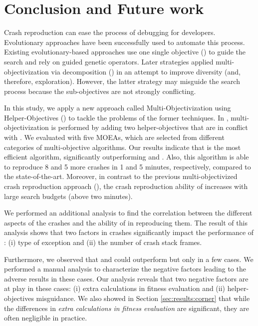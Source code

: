 
\section{Conclusion and Future work} 

Crash reproduction can ease the process of debugging for developers. Evolutionary approaches have been successfully used to automate this process.
Existing evolutionary-based approaches use one single objective (\ie \CrashFunction) to guide the search and rely on guided genetic operators. 
Later strategies applied multi-objectivization via decomposition (\decomposition) in an attempt to improve diversity (and, therefore, exploration). However, the latter strategy may misguide the search process because the sub-objectives are not strongly conflicting.

In this study, we apply a new approach called Multi-Objectivizati\-on using Helper-Objectives (\moho) to tackle the problems of the former techniques. In \moho, multi-objectivization is performed by adding two helper-objectives that are in conflict with \CrashFunction. We evaluated \moho with five MOEAs, which are selected from different categories of multi-objective algorithms. Our results indicate that \moho is the most efficient algorithm, significantly outperforming \SGGA and \decomposition. Also, this algorithm is able to reproduce 8 and 5 more crashes in 1 and 5 minutes, respectively, compared to the state-of-the-art. Moreover, in contrast to the previous multi-objectivized crash reproduction approach (\decomposition), the crash reproduction ability of \moho increases with large search budgets (\ie above two minutes).

We performed an additional analysis to find the correlation between the different aspects of the crashes and the ability of \moho in reproducing them. The result of this analysis shows that two factors in crashes significantly impact the performance of \moho: (i) type of exception and (ii) the number of crash stack frames.

Furthermore, we observed that \SGGA and \decomposition could outperform \moho but only in a few cases. We performed a manual analysis to characterize the negative factors leading to the adverse results in these cases. Our analysis reveals that two negative factors are at play in these cases: (i) extra calculations in fitness evaluation and (ii) helper-objectives misguidance. We also showed in Section \ref{sec:results:corner} that while the differences in \textit{extra calculations in fitness evaluation} are significant, they are often negligible in practice.

